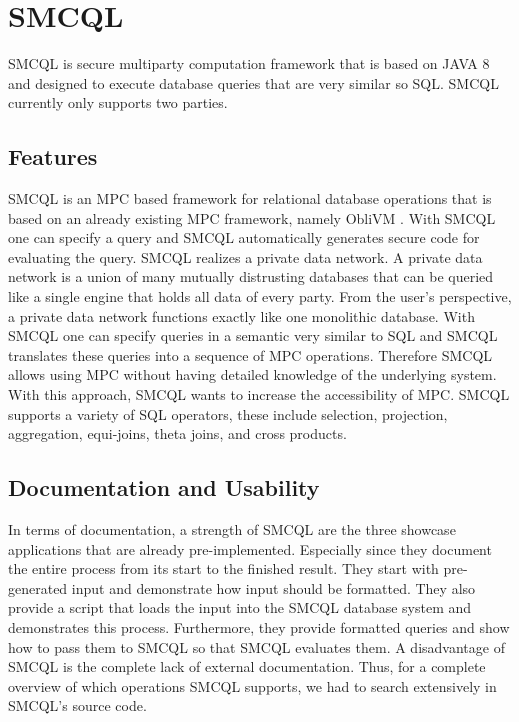 \section{SMCQL}
SMCQL \cite{bater} is secure multiparty computation framework that is based on JAVA 8 and designed to execute database queries that are very similar so SQL. SMCQL currently only supports two parties. 
\subsection{Features}
SMCQL is an MPC based framework for relational database operations that is based on an already existing MPC framework, namely ObliVM \cite{liu2015oblivm}. With SMCQL one can specify a query and SMCQL automatically generates secure code for evaluating the query. 
SMCQL realizes a private data network. A private data network is a union of many mutually distrusting databases that can be queried like a single engine that holds all data of every party. From the user's perspective, a private data network functions exactly like one monolithic database. With SMCQL one can specify queries in a semantic very similar to SQL and SMCQL translates these queries into a sequence of MPC operations. Therefore SMCQL allows using MPC without having detailed knowledge of the underlying system. With this approach, SMCQL wants to increase the accessibility of MPC. SMCQL supports a variety of SQL operators, these include selection, projection, aggregation, equi-joins, theta joins, and cross products. 


\subsection{Documentation and Usability}
In terms of documentation, a strength of SMCQL are the three showcase applications that are already pre-implemented. Especially since they document the entire process from its start to the finished result. They start with pre-generated input and demonstrate how input should be formatted. They also provide a script that loads the input into the SMCQL database system and demonstrates this process. Furthermore, they provide formatted queries and show how to pass them to SMCQL so that SMCQL evaluates them. A disadvantage of SMCQL is the complete lack of external documentation. Thus, for a complete overview of which operations SMCQL supports, we had to search extensively in SMCQL's source code.



